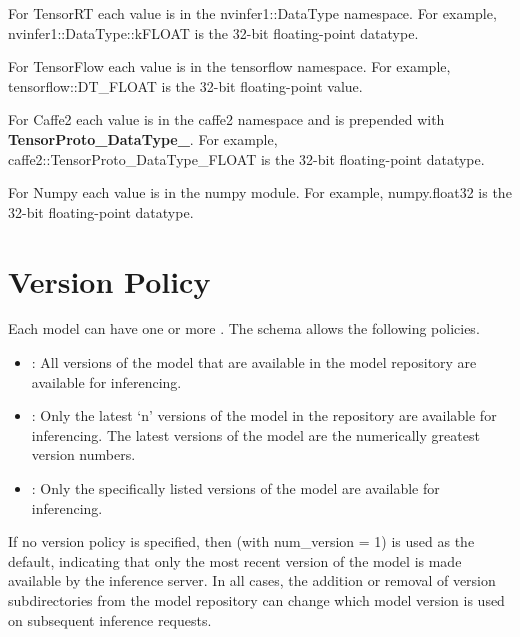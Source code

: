 \documentclass[letterpaper,10pt,english]{sphinxmanual}
\begin{document}
For TensorRT each value is in the nvinfer1::DataType namespace. For
example, nvinfer1::DataType::kFLOAT is the 32-bit floating-point
datatype.

For TensorFlow each value is in the tensorflow namespace. For example,
tensorflow::DT\_FLOAT is the 32-bit floating-point value.

For Caffe2 each value is in the caffe2 namespace and is prepended with
{\color{red}\bfseries{}TensorProto\_DataType\_}. For example, caffe2::TensorProto\_DataType\_FLOAT
is the 32-bit floating-point datatype.

For Numpy each value is in the numpy module. For example, numpy.float32
is the 32-bit floating-point datatype.


\section{Version Policy}
\label{\detokenize{model_configuration:version-policy}}\label{\detokenize{model_configuration:section-version-policy}}
Each model can have one or more {\hyperref[\detokenize{model_repository:section-model-versions}]{}}. The
 schema allows
the following policies.
\begin{itemize}
\item {} 
: All versions
of the model that are available in the model repository are
available for inferencing.

\item {} 
: Only the
latest ‘n’ versions of the model in the repository are available for
inferencing. The latest versions of the model are the numerically
greatest version numbers.

\item {} 
: Only the
specifically listed versions of the model are available for
inferencing.

\end{itemize}

If no version policy is specified, then  (with
num\_version = 1) is used as the default, indicating that only the most
recent version of the model is made available by the inference
server. In all cases, the addition or removal of version
subdirectories from the model repository can change which model
version is used on subsequent inference requests.
\end{document}
